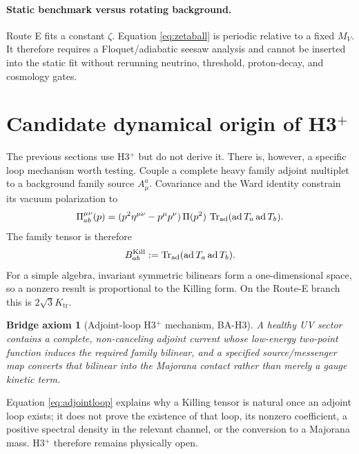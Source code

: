 \documentclass[11pt]{article}
\numberwithin{equation}{section}
\newcommand{\Ktr}{K_{\mathrm{tr}}}
\newcommand{\Tr}{\operatorname{Tr}}
\newtheorem{assumption}[theorem]{Bridge axiom}
\begin{document}
\paragraph{Static benchmark versus rotating background.}
Route E fits a constant \(\zeta\).  Equation \eqref{eq:zetaball} is periodic
relative to a fixed \(M_V\).  It therefore requires a Floquet/adiabatic
seesaw analysis and cannot be inserted into the static fit without rerunning
neutrino, threshold, proton-decay, and cosmology gates.

\section{Candidate dynamical origin of \texorpdfstring{H3$^+$}{H3+}}

The previous sections use H3$^+$ but do not derive it.  There is, however, a
specific loop mechanism worth testing.  Couple a complete heavy family
adjoint multiplet to a background family source \(A_\mu^a\).  Covariance and
the Ward identity constrain its vacuum polarization to
\begin{equation}
 \Pi_{ab}^{\mu\nu}(p)=
 (p^2\eta^{\mu\nu}-p^\mu p^\nu)\,\Pi(p^2)\,
 \Tr_{\rm ad}(\operatorname{ad}T_a\operatorname{ad}T_b).
 \label{eq:adjointloop}
\end{equation}
The family tensor is therefore
\begin{equation}
 B_{ab}^{\rm Kill}:=
 \Tr_{\rm ad}(\operatorname{ad}T_a\operatorname{ad}T_b).
\end{equation}
For a simple algebra, invariant symmetric bilinears form a one-dimensional
space, so a nonzero result is proportional to the Killing form.  On the
Route-E branch this is \(2\sqrt3\Ktr\).

\begin{assumption}[Adjoint-loop H3$^+$ mechanism, BA-H3]
A healthy UV sector contains a complete, non-canceling adjoint current whose
low-energy two-point function induces the required family bilinear, and a
specified source/messenger map converts that bilinear into the Majorana
contact rather than merely a gauge kinetic term.
\end{assumption}

Equation \eqref{eq:adjointloop} explains why a Killing tensor is natural once
an adjoint loop exists; it does not prove the existence of that loop, its
nonzero coefficient, a positive spectral density in the relevant channel, or
the conversion to a Majorana mass.  H3$^+$ therefore remains physically open.
\end{document}
